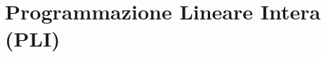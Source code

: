\setcounter{part}{2}
\setcounter{chapter}{9}

\part{Programmazione Lineare Intera (PLI)}\label{part:pli}







